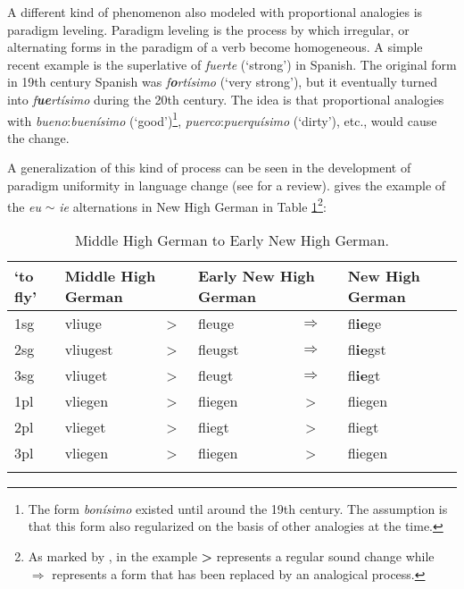 
A different kind of phenomenon also modeled with proportional analogies is paradigm leveling. Paradigm leveling is the process by which irregular, or alternating forms in the paradigm of a verb become homogeneous. A simple recent example is the superlative of \textit{fuerte} (`strong') in Spanish. The original form in 19th century Spanish was \textit{f\textbf{o}rtísimo} (`very strong'), but it eventually turned into \textit{f\textbf{ue}rtísimo} during the 20th century. The idea is that proportional analogies with \textit{bueno}:\textit{buenísimo} (`good')\footnote{The form \textit{bonísimo} existed until around the 19th century. The assumption is that this form also regularized on the basis of other analogies at the time.}, \textit{puerco}:\textit{puerquísimo} (`dirty'), etc., would cause the change.

A generalization of this kind of process can be seen in the development of paradigm uniformity in language change (see \textcite{Albright.2008} for a review). \textcite[144]{Albright.2008} gives the example of the \textit{eu} $\sim$ \textit{ie} alternations in New High German in Table \ref{tab:exe-change-nhg}\footnote{As marked by \textcite[144]{Albright.2008}, in the example \textbf{>} represents a regular sound change while $\Rightarrow$ represents a form that has been replaced by an analogical process.}:


\begin{table}[!htpb]
    \small
    \caption{Middle High German to Early New High German.}\label{tab:exe-change-nhg}
    \begin{tabular}[t]{llclcl}
      \lsptoprule
      `to fly' & \multicolumn{2}{l}{Middle High German} & \multicolumn{2}{l}{Early New High German} & New High German                            \\
      \midrule
      1sg      & vliuge                                 & >                                         & fleuge  & $\Rightarrow$ & fl\textbf{ie}ge  \\
      2sg      & vliugest                               & >                                         & fleugst & $\Rightarrow$ & fl\textbf{ie}gst \\
      3sg      & vliuget                                & >                                         & fleugt  & $\Rightarrow$ & fl\textbf{ie}gt  \\
      1pl      & vliegen                                & >                                         & fliegen & >             & fliegen          \\
      2pl      & vlieget                                & >                                         & fliegt  & >             & fliegt           \\
      3pl      & vliegen                                & >                                         & fliegen & >             & fliegen          \\
      \lspbottomrule
    \end{tabular}
\end{table}


